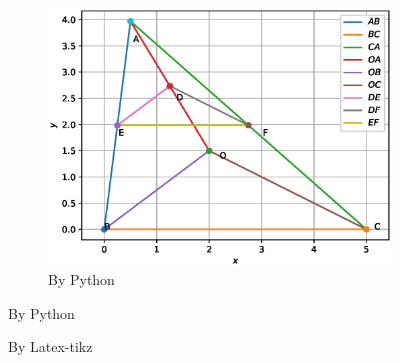 \documentclass{beamer}
\begin{document}
\begin{frame}
\begin{figure}[!ht]
\begin{flushleft}
\begin{subfigure}{0.25\textwidth}
\includegraphics[scale=0.5]{./figs/similartrianglefig.eps}
\caption{\tiny By Python}
\label{fig:triabcpy}
\end{subfigure}
\end{flushleft}
\end{figure}
\end{frame}


\begin{frame}[shrink=30]

\begin{flushleft}
\begin{figure}[!ht]


\caption{ By Latex-tikz}
\label{fig:similar}
\end{figure}
\end{flushleft}
\end{frame}
\end{document}
